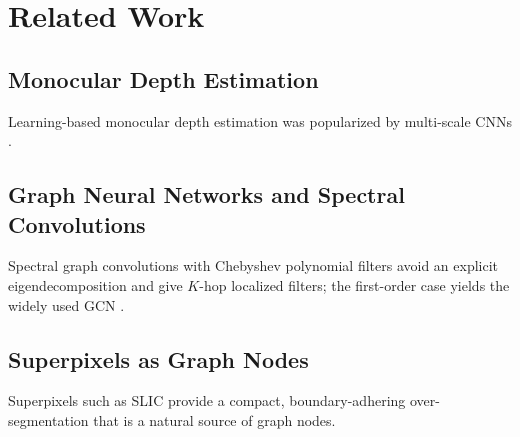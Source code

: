 \section{Related Work}
\label{sec:related}

\subsection{Monocular Depth Estimation}
Learning-based monocular depth estimation was popularized by multi-scale CNNs \cite{eigen2014depth}.

\subsection{Graph Neural Networks and Spectral Convolutions}
Spectral graph convolutions with Chebyshev polynomial filters \cite{defferrard2016chebnet} avoid an explicit eigendecomposition and give $K$-hop localized filters; the first-order case yields the widely used GCN \cite{kipf2017gcn}.

\subsection{Superpixels as Graph Nodes}
Superpixels such as SLIC \cite{achanta2012slic} provide a compact, boundary-adhering over-segmentation that is a natural source of graph nodes.
